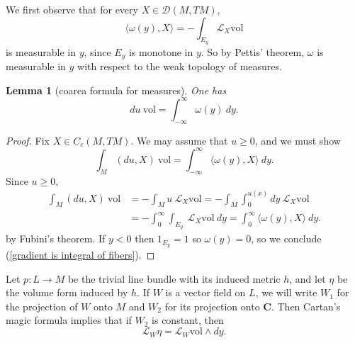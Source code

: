 \documentclass[reqno,12pt,letterpaper]{amsart}
\newcommand{\CC}{\mathbf{C}}
\newcommand{\vol}{\mathrm{vol}}
\newtheorem{lemma}[theorem]{Lemma}
\theoremstyle{definition}
\numberwithin{equation}{section}
\begin{document}
We first observe that for every $X \in \mathcal D(M, TM)$,
$$\langle \omega(y), X\rangle = -\int_{E_y} \mathcal L_X\vol$$
is measurable in $y$, since $E_y$ is monotone in $y$.
So by Pettis' theorem, $\omega$ is measurable in $y$ with respect to the weak topology of measures.

\begin{lemma}[coarea formula for measures]\label{Coarea1}
One has
$$du ~\vol = \int_{-\infty}^\infty \omega(y) ~dy.$$
\end{lemma}
\begin{proof}
Fix $X \in C_c(M, TM)$. We may assume that $u \geq 0$, and we must show
\begin{equation}
\label{gradient is integral of fibers}
\int_M (du, X) ~\vol = \int_{-\infty}^\infty \langle \omega(y), X\rangle ~dy.
\end{equation}
Since $u \geq 0$,
\begin{align*}
\int_M (du, X) ~\vol &= -\int_M u~\mathcal L_X\vol = -\int_M \int_0^{u(x)} dy ~\mathcal L_X\vol\\
&= -\int_0^\infty \int_{E_y} ~\mathcal L_X\vol ~dy = \int_0^\infty \langle \omega(y), X\rangle ~dy.
\end{align*}
by Fubini's theorem.
If $y < 0$ then $1_{E_y} = 1$ so $\omega(y) = 0$, so we conclude (\ref{gradient is integral of fibers}).
\end{proof}

Let $p: L \to M$ be the trivial line bundle with its induced metric $h$, and let $\eta$ be the volume form induced by $h$.
If $W$ is a vector field on $L$, we will write $W_1$ for the projection of $W$ onto $M$ and $W_2$ for its projection onto $\CC$.
Then Cartan's magic formula implies that if $W_2$ is constant, then
\begin{equation}
\label{Lie derivative computation}
\mathcal L_W\eta = \mathcal L_W\vol \wedge dy.
\end{equation}
\end{document}
